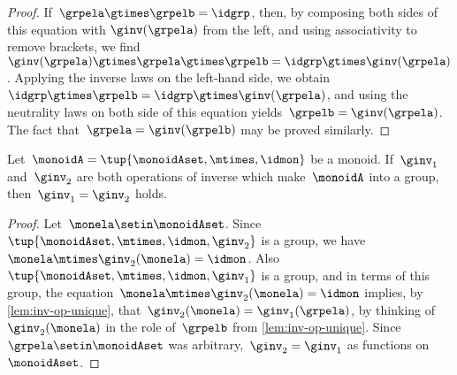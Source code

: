 \begin{proof}
    If~$\grpela \gtimes \grpelb = \idgrp$, then, by composing both sides of this equation with $\ginv(\grpela)$ from the left, and using associativity to remove brackets, we find~$\ginv(\grpela) \gtimes \grpela \gtimes \grpelb = \idgrp \gtimes \ginv(\grpela)$.
    Applying the inverse laws on the left-hand side, we obtain~$\idgrp \gtimes \grpelb = \idgrp \gtimes \ginv(\grpela)$, and using the neutrality laws on both side of this equation yields~$\grpelb =  \ginv(\grpela)$.
    The fact that~$\grpela = \ginv(\grpelb)$ may be proved similarly.
\end{proof}

\begin{corollary}
    \label{cor:inv-op-unique}
    Let~$\monoidA = \tup{\monoidAset, \mtimes,  \idmon }$ be a monoid.
    If~$\ginv_1$ and~$\ginv_2$ are both operations of inverse which make~$\monoidA$ into a group, then~$\ginv_1 =\ginv_2$ holds.
\end{corollary}

\begin{proof}
    Let~$\monela \setin \monoidAset$.
    Since~$\tup{\monoidAset, \mtimes,  \idmon, \ginv_2 }$ is a group, we have~$\monela \mtimes \ginv_2(\monela) = \idmon$.
    Also~$\tup{\monoidAset, \mtimes,  \idmon, \ginv_1}$ is a group, and in terms of this group, the equation~$\monela \mtimes \ginv_2(\monela) = \idmon$ implies, by \cref{lem:inv-op-unique}, that~$\ginv_2(\monela) = \ginv_1(\grpela)$, by thinking of~$\ginv_2(\monela)$ in the role of~$\grpelb$ from \cref{lem:inv-op-unique}.
    Since~$\grpela \setin \monoidAset$ was arbitrary,~$\ginv_2 = \ginv_1$ as functions on~$\monoidAset$.
\end{proof}


